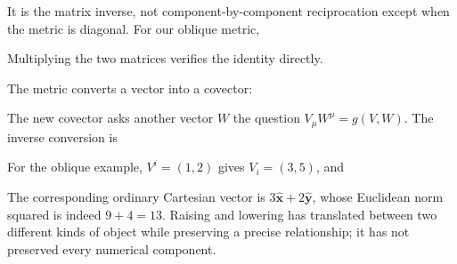 \documentclass[
  11pt,
  letterpaper,
  oneside,
  openany]{scrbook}
\begin{document}
It is the matrix inverse, not component-by-component reciprocation
except when the metric is diagonal. For our oblique metric,

\begin{center}
\begingroup
{}
\ifdim\wd\grmathbox>\linewidth
\resizebox{\linewidth}{!}{\usebox{\grmathbox}}
\else\usebox{\grmathbox}\fi
\endgroup
\end{center}

Multiplying the two matrices verifies the identity directly.

The metric converts a vector into a covector:

\begin{center}
\begingroup
{}
\ifdim\wd\grmathbox>\linewidth
\resizebox{\linewidth}{!}{\usebox{\grmathbox}}
\else\usebox{\grmathbox}\fi
\endgroup
\end{center}

The new covector asks another vector \(W\) the question
\(V_\mu W^\mu=g(V,W)\). The inverse conversion is

\begin{center}
\begingroup
{}
\ifdim\wd\grmathbox>\linewidth
\resizebox{\linewidth}{!}{\usebox{\grmathbox}}
\else\usebox{\grmathbox}\fi
\endgroup
\end{center}

For the oblique example, \(V^i=(1,2)\) gives \(V_i=(3,5)\), and

\begin{center}
\begingroup
{}
\ifdim\wd\grmathbox>\linewidth
\resizebox{\linewidth}{!}{\usebox{\grmathbox}}
\else\usebox{\grmathbox}\fi
\endgroup
\end{center}

The corresponding ordinary Cartesian vector is
\(3\hat{\mathbf x}+2\hat{\mathbf y}\), whose Euclidean norm squared is
indeed \(9+4=13\). Raising and lowering has translated between two
different kinds of object while preserving a precise relationship; it
has not preserved every numerical component.
\end{document}
